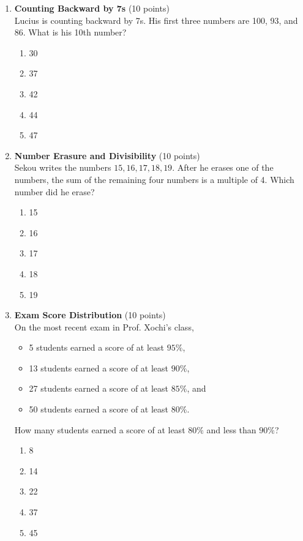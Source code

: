 \begin{enumerate}
  \item \textbf{Counting Backward by 7s} (10 points)\\
  Lucius is counting backward by 7s. His first three numbers are 100, 93, and 86. What is his 10th number?
  \begin{enumerate}[label=(\Alph*)]
    \item 30
    \item 37
    \item 42
    \item 44
    \item 47
  \end{enumerate}
  \begin{subanswer}
  \end{subanswer}

  \item \textbf{Number Erasure and Divisibility} (10 points)\\
  Sekou writes the numbers $15,16,17,18,19$. After he erases one of the numbers, the sum of the remaining four numbers is a multiple of 4. Which number did he erase?
  \begin{enumerate}[label=(\Alph*)]
    \item 15
    \item 16
    \item 17
    \item 18
    \item 19
  \end{enumerate}
  \begin{subanswer}
  \end{subanswer}

  \item \textbf{Exam Score Distribution} (10 points)\\
  On the most recent exam in Prof. Xochi's class,
  \begin{itemize}
    \item 5 students earned a score of at least $95\%$,
    \item 13 students earned a score of at least $90\%$,
    \item 27 students earned a score of at least $85\%$, and
    \item 50 students earned a score of at least $80\%$.
  \end{itemize}
  How many students earned a score of at least $80\%$ and less than $90\%$?
  \begin{enumerate}[label=(\Alph*)]
    \item 8
    \item 14
    \item 22
    \item 37
    \item 45
  \end{enumerate}
  \begin{subanswer}
  \end{subanswer}


\end{enumerate}
